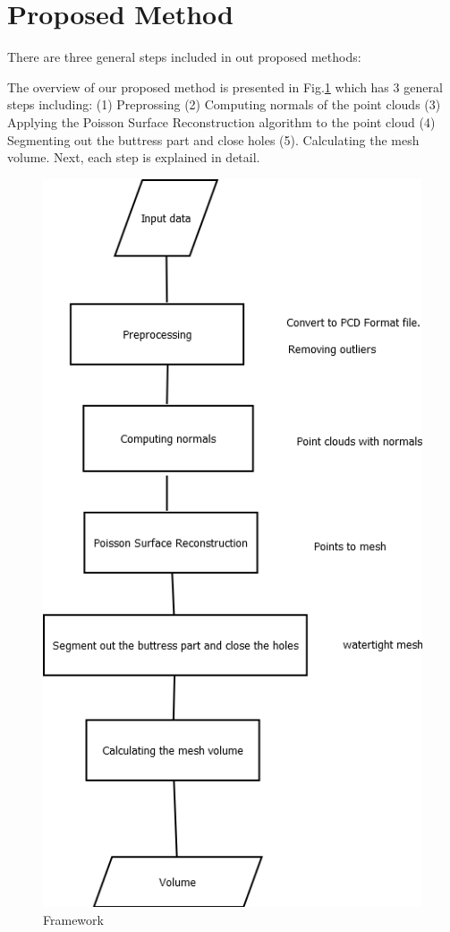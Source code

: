 \documentclass[runningheads,a4paper]{llncs}
\begin{document}
\section{Proposed Method}
There are three general steps included in out proposed methods: 

The overview of our proposed method is presented in Fig.\ref{fig:framework}  which has $3$ general steps including: (1) Preprossing (2) Computing normals of the point clouds (3) Applying the Poisson Surface Reconstruction algorithm to the point cloud (4) Segmenting out the buttress part and close holes (5). Calculating the mesh volume. Next, each step is explained in detail. 

\begin{figure}
\centering
\includegraphics[scale=.35]{framework.PNG}
\caption{Framework}
\label{fig:framework}
\end{figure}
\end{document}
